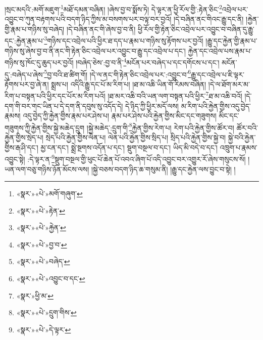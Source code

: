།སྲང་མདའི་:མགོ་མཇུག་\footnote{«སྣར་»«པེ་»མགོ་གཞུག་}མཐོ་དམན་བཞིན། །ཞེས་བྱ་བ་སྨོས་ཏེ། དེ་ལྟར་ན་ཕྱི་རོལ་གྱི་:རྟེན་ཅིང་\footnote{«སྣར་»«པེ་»རྟེན་}འབྲེལ་པར་འབྱུང་བ་ཀུན་བརྟགས་པའི་བདག་ཉིད་ཀྱིས་མ་བསགས་པར་བལྟ་བར་བྱའོ། །དེ་བཞིན་ནང་གིའང་རྒྱུ་དང་ནི། །རྐྱེན་གྱི་རྣམ་པ་གཉིས་སུ་བཞེད། །དེ་བཞིན་ནང་གི་ཞེས་བྱ་བ་ནི། ཕྱི་རོལ་གྱི་རྟེན་ཅིང་འབྲེལ་པར་འབྱུང་བ་བཞིན་དུ་རྒྱུ་དང་:རྐྱེན་རྣམ་པ་\footnote{«སྣར་»«པེ་»རྐྱེན་}གཉིས་དང་འབྲེལ་པའི་ཕྱིར་ཐ་དད་པ་རྣམ་པ་གཉིས་སུ་རྟོགས་པར་བྱའོ། །རྒྱུ་དང་རྐྱེན་གྱི་རྣམ་པ་གཉིས་སུ་ཞེས་བྱ་བ་ནི་ནང་གི་རྟེན་ཅིང་འབྲེལ་པར་འབྱུང་བ་རྒྱུ་དང་འབྲེལ་པ་དང་། རྐྱེན་དང་འབྲེལ་པས་རྣམ་པ་གཉིས་སུ་ཁོང་དུ་ཆུད་པར་བྱའོ། །བཞེད་ཅེས་:བྱ་བ་ནི་\footnote{«སྣར་»«པེ་»བྱ་བ་}མངོན་པར་བཞེད་པ་དང་དགོངས་པ་དང་། མངོན་དུ་:བཞེད་པ་ཞེས་\footnote{«སྣར་»«པེ་»བཞེད་}བྱ་བའི་ཐ་ཚིག་གོ། །དེ་ལ་ནང་གི་རྟེན་ཅིང་འབྲེལ་པར་:འབྱུང་བ་\footnote{«སྣར་»«པེ་»འབྱུང་བ་དང་}རྒྱུ་དང་འབྲེལ་པ་ཇི་ལྟར་རྟོགས་པར་བྱ་ཞེ་ན། སྨྲས་པ། འདིའི་རྒྱུ་དང་པོ་མ་རིག་པ། །ཐ་མ་འཆི་ཡིན་གོ་རིམས་བཞིན། །དེ་ལ་ཐོག་མར་མ་རིག་པ་བསྟན་པའི་ཕྱིར་དང་པོར་མ་རིག་པའོ། །ཐ་མར་འཆི་བའི་ཡན་ལག་བསྟན་པའི་ཕྱིར་\footnote{«སྣར་»ཕྱི་མ་}ཐ་མ་འཆི་བའོ། །དེ་དག་གི་བར་གང་ཡིན་པ་དེ་དག་ནི་དབུས་སུ་འདོད་དེ། དེ་ཉིད་ཀྱི་ཕྱིར་མདོ་ལས། མ་རིག་པའི་རྐྱེན་གྱིས་འདུ་བྱེད་རྣམས། འདུ་བྱེད་ཀྱི་རྐྱེན་གྱིས་རྣམ་པར་ཤེས་པ། རྣམ་པར་ཤེས་པའི་རྐྱེན་གྱིས་མིང་དང་གཟུགས། མིང་དང་གཟུགས་ཀྱི་རྐྱེན་གྱིས་སྐྱེ་མཆེད་དྲུག །སྐྱེ་མཆེད་:དྲུག་གི་\footnote{«སྣར་»«པེ་»དྲུག་གིས་}རྐྱེན་གྱིས་རེག་པ། རེག་པའི་རྐྱེན་གྱིས་ཚོར་བ། ཚོར་བའི་རྐྱེན་གྱིས་སྲེད་པ། སྲེད་པའི་རྐྱེན་གྱིས་ལེན་པ། ལེན་པའི་རྐྱེན་གྱིས་སྲིད་པ། སྲིད་པའི་རྐྱེན་གྱིས་སྐྱེ་བ། སྐྱེ་བའི་རྐྱེན་གྱིས་རྒ་ཤི་དང་། མྱ་ངན་དང་། སྨྲེ་སྔགས་འདོན་པ་དང་། སྡུག་བསྔལ་བ་དང་། ཡིད་མི་བདེ་བ་དང་། འཁྲུག་པ་རྣམས་འབྱུང་སྟེ། :དེ་ལྟར་ན་\footnote{«སྣར་»«པེ་»དེ་ལྟར་}སྡུག་བསྔལ་གྱི་ཕུང་པོ་ཆེན་པོ་འབའ་ཞིག་པོ་འདི་འབྱུང་བར་འགྱུར་རོ་ཞེས་གསུངས་སོ། །ཡན་ལག་བཅུ་གཉིས་ཉོན་མོངས་ལས། །སྐྱེ་བཅས་བདག་ཉིད་ཆ་གསུམ་ནི། །རྒྱུ་དང་རྐྱེན་ལས་བྱུང་བ་སྟེ། །
